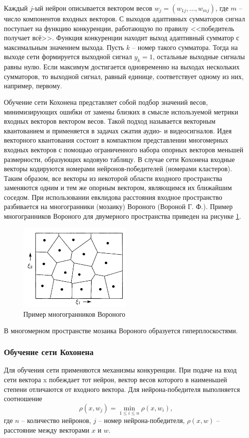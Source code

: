 \documentclass[bachelor, och, referat]{SCWorks}
\begin{document}
Каждый $j$-ый нейрон описывается вектором весов $w_j = (w_{1j}, \dots, w_{mj})$, где
$m$ -- число компонентов входных векторов. С выходов адаптивных
сумматоров сигнал поступает на функцию конкуренции, работающую по
правилу <<победитель получает всё>>. Функция конкуренции находит выход
адаптивный сумматор с максимальным значением выхода. Пусть $k$ -- номер такого сумматора.
Тогда на выходе сети формируется выходной сигнал $y_k = 1$, остальные
выходные сигналы равны нулю. Если максимум
достигается одновременно на выходах нескольких сумматоров, то выходной
сигнал, равный единице, соответствует одному из них, например, первому. 

Обучение сети Кохонена представляет собой подбор значений весов,
минимизирующих ошибки от замены близких в смысле используемой
метрики входных векторов вектором весов. Такой подход называется
векторным квантованием и применяется в задачах сжатия аудио- и
видеосигналов. Идея векторного квантования состоит в компактном
представлении многомерных входных векторов с помощью ограниченного
набора опорных векторов меньшей размерности, образующих кодовую
таблицу. В случае сети Кохонена входные векторы кодируются номерами
нейронов-победителей (номерами кластеров). Таким образом, все векторы из
некоторой области входного пространства заменяются одним и тем же
опорным вектором, являющимся их ближайшим соседом. При использовании
евклидова расстояния входное пространство разбивается на многогранники
(мозаику) Вороного (Вороной Г. Ф.). Пример многогранников Вороного
для двумерного пространства приведен на рисунке \ref{voronoy}.

\begin{figure}[H]
    \centering
    \includegraphics[width=0.5\textwidth]{7.png}
    \caption{Пример многогранников Вороного}
    \label{voronoy}
\end{figure}

В многомерном пространстве мозаика Вороного образуется
гиперплоскостями. 

\subsubsection{Обучение сети Кохонена}
Для обучения сети
применяются механизмы конкуренции. При подаче на вход сети вектора x
побеждает тот нейрон, вектор весов которого в наименьшей степени
отличаются от входного вектора. Для нейрона-победителя выполняется
соотношение
\[ \rho(x, w_j) = \min_{1 \leq i \leq n} \rho(x, w_i), \]
где $n$ -- количество нейронов, $j$ -- номер нейрона-победителя,
$\rho(x, w)$ -- расстояние между векторами $x$ и $w$.
\end{document}
